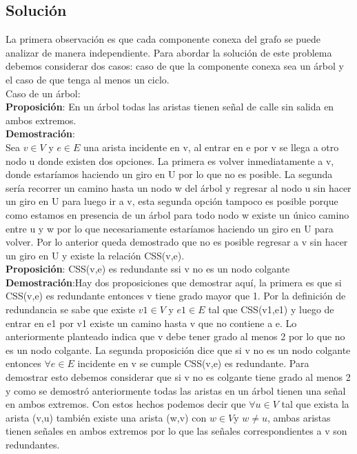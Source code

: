 \documentclass{report}
\begin{document}
\subsection{Soluci\'on}
La primera observaci\'on es que cada componente conexa del grafo se puede analizar de manera independiente. Para abordar la soluci\'on de este problema debemos considerar dos casos: caso de que la componente conexa sea un \'arbol y el caso de que tenga al menos un ciclo.\\
Caso de un \'arbol:\\
{\bf Proposici\'on}: En un \'arbol todas las aristas tienen se\~nal de calle sin salida en ambos extremos.\\
{\bf Demostraci\'on}:\\
Sea $v \in V$ y $e \in E$ una arista incidente en v, al entrar en e por v se llega a otro nodo u donde existen dos opciones. La primera es volver inmediatamente a v, donde estar\'iamos haciendo un giro en U por lo que no es posible. La segunda ser\'ia recorrer un camino hasta un nodo w del \'arbol y regresar al nodo u sin hacer un giro en U para luego ir a v, esta segunda opci\'on tampoco es posible porque como estamos en presencia de un \'arbol para todo nodo w existe un \'unico camino entre u y w por lo que necesariamente estar\'iamos haciendo un giro en U para volver. Por lo anterior queda demostrado que no es posible regresar a v sin hacer un giro en U y existe la relaci\'on CSS(v,e).\\
{\bf Proposici\'on}: CSS(v,e) es redundante ssi v no es un nodo colgante\\
{\bf Demostraci\'on}:Hay dos proposiciones que demostrar aqu\'i, la primera es que si CSS(v,e) es redundante entonces v tiene grado mayor que 1. Por la definici\'on de redundancia se sabe que existe $v1 \in V$ y $e1 \in E$ tal que CSS(v1,e1) y luego de entrar en e1 por v1 existe un camino hasta v que no contiene a e. Lo anteriormente planteado indica que v debe tener grado al menos 2 por lo que no es un nodo colgante. La segunda proposici\'on dice que si v no es un nodo colgante entonces $\forall e \in E$ incidente en v se cumple CSS(v,e) es redundante. Para demostrar esto debemos considerar que si v no es colgante tiene grado al menos 2 y como se demostr\'o anteriormente todas las aristas en un \'arbol tienen una se\~nal en ambos extremos. Con estos hechos podemos decir que $\forall u \in V$ tal que exista la arista (v,u) tambi\'en existe una arista (w,v) con $w\in V $y $w \ne u$, ambas aristas tienen se\~nales en ambos extremos por lo que las se\~nales correspondientes a v son redundantes.\\
\end{document}
